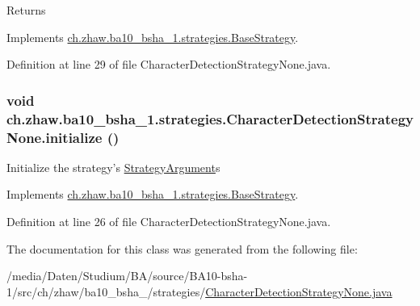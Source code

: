 \begin{DoxyReturn}{Returns}

\end{DoxyReturn}


Implements \hyperlink{classch_1_1zhaw_1_1ba10__bsha__1_1_1strategies_1_1BaseStrategy_aa0ebed55eed45409bad13d43a0058780}{ch.zhaw.ba10\_\-bsha\_\-1.strategies.BaseStrategy}.

Definition at line 29 of file CharacterDetectionStrategyNone.java.\hypertarget{classch_1_1zhaw_1_1ba10__bsha__1_1_1strategies_1_1CharacterDetectionStrategyNone_ab1d3f026d9f5488286261d2dde224bde}{
\subsubsection[{initialize}]{\setlength{\rightskip}{0pt plus 5cm}void ch.zhaw.ba10\_\-bsha\_\-1.strategies.CharacterDetectionStrategyNone.initialize ()}}
\label{classch_1_1zhaw_1_1ba10__bsha__1_1_1strategies_1_1CharacterDetectionStrategyNone_ab1d3f026d9f5488286261d2dde224bde}
Initialize the strategy's \hyperlink{classch_1_1zhaw_1_1ba10__bsha__1_1_1StrategyArgument}{StrategyArgument}s 

Implements \hyperlink{classch_1_1zhaw_1_1ba10__bsha__1_1_1strategies_1_1BaseStrategy_af6ea27835befac71906915236a347450}{ch.zhaw.ba10\_\-bsha\_\-1.strategies.BaseStrategy}.

Definition at line 26 of file CharacterDetectionStrategyNone.java.

The documentation for this class was generated from the following file:\begin{DoxyCompactItemize}
\item 
/media/Daten/Studium/BA/source/BA10-\/bsha-\/1/src/ch/zhaw/ba10\_\-bsha\_/strategies/\hyperlink{CharacterDetectionStrategyNone_8java}{CharacterDetectionStrategyNone.java}\end{DoxyCompactItemize}
